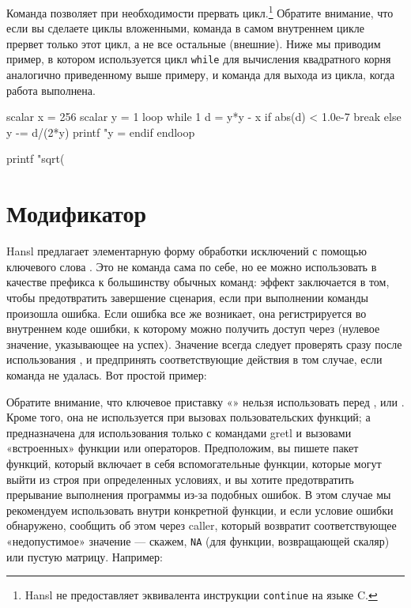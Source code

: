 Команда позволяет при необходимости прервать
цикл.\footnote{Hansl не предоставляет эквивалента инструкции
  \texttt{continue} на языке C.}  Обратите внимание, что если вы
сделаете циклы вложенными, команда  в самом внутреннем
цикле прервет только этот цикл, а не все остальные (внешние). Ниже мы
приводим пример, в котором используется цикл \texttt{while} для
вычисления квадратного корня аналогично приведенному выше примеру, и
команда  для выхода из цикла, когда работа выполнена.
\begin{code}
scalar x = 256
scalar y = 1
loop while 1
    d = y*y - x
    if abs(d) < 1.0e-7
        break
    else
        y -= d/(2*y)
        printf "y = %
    endif
endloop

printf "sqrt(%
\end{code}

\section{Модификатор }

Hansl предлагает элементарную форму обработки исключений с помощью
ключевого слова . Это не команда сама по себе, но ее можно
использовать в качестве префикса к большинству обычных команд: эффект
заключается в том, чтобы предотвратить завершение сценария, если при
выполнении команды произошла ошибка. Если ошибка все же возникает, она
регистрируется во внутреннем коде ошибки, к которому можно получить
доступ через  (нулевое значение, указывающее на
успех). Значение  всегда следует проверять сразу после
использования , и предпринять соответствующие действия в
том случае, если команда не удалась. Вот простой пример:


Обратите внимание, что ключевое приставку «» нельзя
использовать перед ,  или . Кроме того,
она не используется при вызовах пользовательских функций; а
предназначена для использования только с командами gretl и вызовами
«встроенных» функции или операторов. Предположим, вы пишете пакет
функций, который включает в себя вспомогательные функции, которые
могут выйти из строя при определенных условиях, и вы хотите
предотвратить прерывание выполнения программы из-за подобных ошибок. В
этом случае мы рекомендуем использовать  внутри конкретной
функции, и если условие ошибки обнаружено, сообщить об этом через
caller, который возвратит соответствующее «недопустимое» значение ---
скажем, \texttt{NA} (для функции, возвращающей скаляр) или пустую
матрицу. Например:

